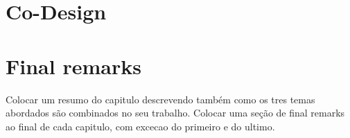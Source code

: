        

\section{Co-Design}
\label{sec:co_design}

    

\section{Final remarks}
\label{sec:final_remarks2}

Colocar um resumo do capitulo descrevendo também como os tres temas abordados são combinados no seu trabalho. 
Colocar uma seção de final remarks ao final de cada capitulo, com excecao do primeiro e do ultimo.
